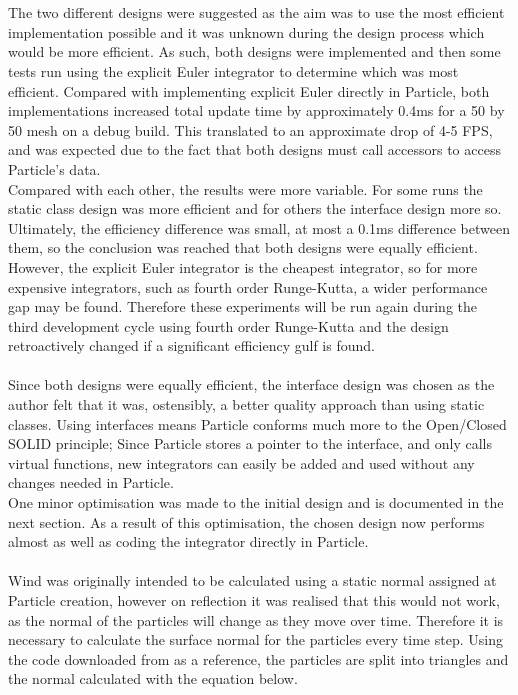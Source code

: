 \\\\The two different designs were suggested as the aim was to use the most efficient implementation possible and it was unknown during the design process which would be more efficient. As such, both designs were implemented and then some tests run using the explicit Euler integrator to determine which was most efficient. Compared with implementing explicit Euler directly in Particle, both implementations increased total update time by approximately 0.4ms for a 50 by 50 mesh on a debug build. This translated to an approximate drop of 4-5 FPS, and was expected due to the fact that both designs must call accessors to access Particle's data.
\\Compared with each other, the results were more variable. For some runs the static class design was more efficient and for others the interface design more so. Ultimately, the efficiency difference was small, at most a 0.1ms difference between them, so the conclusion was reached that both designs were equally efficient. However, the explicit Euler integrator is the cheapest integrator, so for more expensive integrators, such as fourth order Runge-Kutta, a wider performance gap may be found. Therefore these experiments will be run again during the third development cycle using fourth order Runge-Kutta and the design retroactively changed if a significant efficiency gulf is found.
\\\\Since both designs were equally efficient, the interface design was chosen as the author felt that it was, ostensibly, a better quality approach than using static classes. Using interfaces means Particle conforms much more to the Open/Closed SOLID principle; Since Particle stores a pointer to the interface, and only calls virtual functions, new integrators can easily be added and used without any changes needed in Particle.
\\One minor optimisation was made to the initial design and is documented in the next section. As a result of this optimisation, the chosen design now performs almost as well as coding the integrator directly in Particle. 
\\\\Wind was originally intended to be calculated using a static normal assigned at Particle creation, however on reflection it was realised that this would not work, as the normal of the particles will change as they move over time. Therefore it is necessary to calculate the surface normal for the particles every time step. Using the code downloaded from \textcite{Mosegaard2009} as a reference, the particles are split into triangles and the normal calculated with the equation below.
